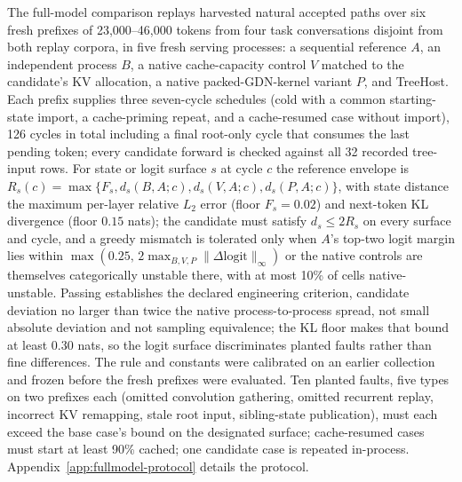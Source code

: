 \documentclass[sigconf,anonymous,review]{acmart}
\newcommand{\sys}{TreeHost}
\begin{document}
The full-model comparison replays harvested natural accepted paths over six fresh prefixes of 23,000--46,000 tokens from four task conversations disjoint from both replay corpora, in five fresh serving processes: a sequential reference $A$, an independent process $B$, a native cache-capacity control $V$ matched to the candidate's KV allocation, a native packed-GDN-kernel variant $P$, and \sys{}. Each prefix supplies three seven-cycle schedules (cold with a common starting-state import, a cache-priming repeat, and a cache-resumed case without import), 126 cycles in total including a final root-only cycle that consumes the last pending token; every candidate forward is checked against all 32 recorded tree-input rows. For state or logit surface $s$ at cycle $c$ the reference envelope is $R_s(c)=\max\{F_s,d_s(B,A;c),d_s(V,A;c),d_s(P,A;c)\}$, with state distance the maximum per-layer relative $L_2$ error (floor $F_s=0.02$) and next-token KL divergence (floor $0.15$ nats); the candidate must satisfy $d_s\le 2R_s$ on every surface and cycle, and a greedy mismatch is tolerated only when $A$'s top-two logit margin lies within $\max(0.25,\,2\max_{B,V,P}\|\Delta\mathrm{logit}\|_\infty)$ or the native controls are themselves categorically unstable there, with at most 10\% of cells native-unstable. Passing establishes the declared engineering criterion, candidate deviation no larger than twice the native process-to-process spread, not small absolute deviation and not sampling equivalence; the KL floor makes that bound at least 0.30 nats, so the logit surface discriminates planted faults rather than fine differences. The rule and constants were calibrated on an earlier collection and frozen before the fresh prefixes were evaluated. Ten planted faults, five types on two prefixes each (omitted convolution gathering, omitted recurrent replay, incorrect KV remapping, stale root input, sibling-state publication), must each exceed the base case's bound on the designated surface; cache-resumed cases must start at least 90\% cached; one candidate case is repeated in-process. Appendix~\ref{app:fullmodel-protocol} details the protocol.
\end{document}
